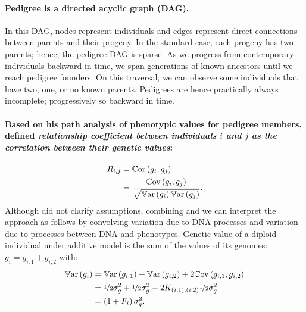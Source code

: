 \paragraph{Pedigree is a directed acyclic graph (DAG).} In this DAG, nodes
represent individuals and edges represent direct connections between parents
and their progeny.
%
In the standard case, each progeny has two parents; hence, the pedigree DAG
is sparse.
%
As we progress from contemporary individuals backward in time, we span
generations of known ancestors until we reach pedigree founders.
%
On this traversal, we can observe some individuals that have two, one, or
no known parents.
%
Pedigrees are hence practically always incomplete; progressively so
backward in time.

\paragraph{Based on his path analysis of phenotypic values for pedigree
members, \cite{wright1922coefficients} defined
\textit{relationship coefficient between individuals $i$ and $j$ as the
correlation between their genetic values}:}
%
\begin{align} \label{eqn:wright_relationship}
  R_{i,j} & = \mathbb{C}\text{or}\left(g_i, g_j\right) \\
          & = \frac{\mathbb{C}\text{ov}\left(g_i, g_j\right)} 
                   {\sqrt{\mathbb{V}\text{ar}\left(g_i\right) \mathbb{V}\text{ar}\left(g_j\right)}} \notag.
\end{align}
%
Although \cite{wright1922coefficients} did not clarify assumptions,
combining \cite{wright1921systems} and \cite{wright1922coefficients}
we can interpret the approach as follows by
convolving variation due to DNA processes and variation due to
processes between DNA and phenotypes.
%
Genetic value of a diploid individual under additive model
is the sum of the values of its genomes:
$g_i = g_{i,1} + g_{i,2}$ with:
%
\begin{align} \label{eqn:g_ind_var}
  \mathbb{V}\text{ar}\left(g_i\right) & = \mathbb{V}\text{ar}\left(g_{i,1}\right) + 
                           \mathbb{V}\text{ar}\left(g_{i,2}\right) +
                           2\mathbb{C}\text{ov}\left(g_{i,1},g_{i,2}\right) \\
                       & = \nicefrac{1}{2}\sigma_g^2 +
                           \nicefrac{1}{2}\sigma_g^2 +
                           2K_{(i,1),(i,2)}\nicefrac{1}{2}\sigma_g^2 \notag \\
                       & = \left(1 + F_i\right)\sigma_g^2. \notag
\end{align}
